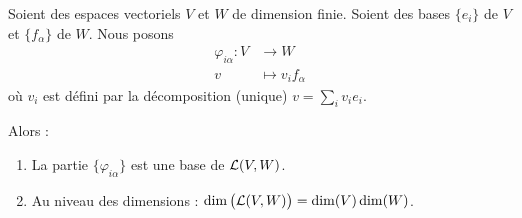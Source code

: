 \begin{lemma}       \label{LEMooJXFIooKDzRWR}
    Soient des espaces vectoriels \( V\) et \( W\) de dimension finie. Soient des bases \( \{e_i\}\) de \( V\) et \( \{f_{\alpha}\}\) de \( W\). Nous posons
    \begin{equation}
        \begin{aligned}
            \varphi_{i\alpha}\colon V&\to W \\
            v&\mapsto v_if_{\alpha} 
        \end{aligned}
    \end{equation}
    où \( v_i\) est défini par la décomposition (unique) \( v=\sum_iv_ie_i\). 

    Alors :
    \begin{enumerate}
        \item
            La partie \( \{\varphi_{i\alpha}\} \) est une base de \( \mathcal{L}(V,W)\).
        \item       \label{ITEMooPMLWooNbTyJI}
            Au niveau des dimensions : \( \dim\big( \mathcal{L}(V,W) \big)=\dim(V)\dim(W)\).
    \end{enumerate}
\end{lemma}

